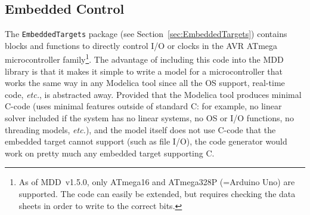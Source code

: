 \documentclass{resources/modelica}
\newcommand{\modelica}[1]{\lstinline[language=modelica]|#1|}
\begin{document}
\subsection{Embedded Control}
\label{sec:EmbeddedControl}


The \modelica{EmbeddedTargets} package (see Section~\ref{sec:EmbeddedTargets}) contains
blocks and functions to directly control I/O or clocks in the AVR ATmega microcontroller family\footnote{As of MDD~v1.5.0, only ATmega16 and ATmega328P (=Arduino Uno) are supported.
The code can easily be extended, but requires checking the data sheets in order
to write to the correct bits.}.
The advantage of including this code into the MDD library is that it makes it
simple to write a model for a microcontroller that works the same way
in any Modelica tool since all the OS support, real-time code, \textit{etc.},
is abstracted away.
Provided that the Modelica tool produces minimal C-code (uses minimal features
outside of standard C: for example, no linear solver included if the system has no linear systems,
no OS or \mbox{I/O} functions, no threading models, \textit{etc.}),
and the model itself does not use C-code that the embedded target cannot support
(such as file \mbox{I/O}), the code generator would work on pretty much any
embedded target supporting C.
\end{document}
